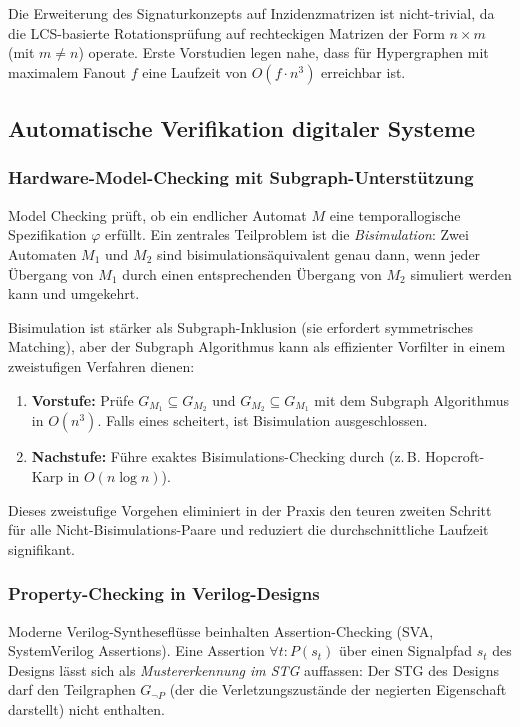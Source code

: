 ﻿\documentclass[a4paper,12pt]{article}
\theoremstyle{definition}
\begin{document}
Die Erweiterung des Signaturkonzepts auf Inzidenzmatrizen ist nicht-trivial, da
die LCS-basierte Rotationsprüfung auf rechteckigen Matrizen der Form $n \times m$
(mit $m \neq n$) operate. Erste Vorstudien legen nahe, dass für Hypergraphen mit
maximalem Fanout $f$ eine Laufzeit von $O(f \cdot n^3)$ erreichbar ist.

\subsection{Automatische Verifikation digitaler Systeme}

\subsubsection{Hardware-Model-Checking mit Subgraph-Unterstützung}

Model Checking \cite{clarke1986automatic} prüft, ob ein endlicher Automat $M$ eine
temporallogische Spezifikation $\varphi$ erfüllt. Ein zentrales Teilproblem ist die
\emph{Bisimulation}: Zwei Automaten $M_1$ und $M_2$ sind bisimulationsäquivalent genau
dann, wenn jeder Übergang von $M_1$ durch einen entsprechenden Übergang von $M_2$
simuliert werden kann und umgekehrt.

Bisimulation ist stärker als Subgraph-Inklusion (sie erfordert symmetrisches Matching),
aber der Subgraph Algorithmus kann als effizienter Vorfilter in einem zweistufigen
Verfahren dienen:
\begin{enumerate}
  \item \textbf{Vorstufe:} Prüfe $G_{M_1} \subseteq G_{M_2}$ und
        $G_{M_2} \subseteq G_{M_1}$ mit dem Subgraph Algorithmus in $O(n^3)$.
        Falls eines scheitert, ist Bisimulation ausgeschlossen.
  \item \textbf{Nachstufe:} Führe exaktes Bisimulations-Checking durch (z.\,B.
        Hopcroft-Karp \cite{hopcroft1971} in $O(n \log n)$).
\end{enumerate}
Dieses zweistufige Vorgehen eliminiert in der Praxis den teuren zweiten Schritt für
alle Nicht-Bisimulations-Paare und reduziert die durchschnittliche Laufzeit
signifikant.

\subsubsection{Property-Checking in Verilog-Designs}

Moderne Verilog-Syntheseflüsse beinhalten Assertion-Checking (SVA, SystemVerilog
Assertions). Eine Assertion $\forall t: P(s_t)$ über einen Signalpfad $s_t$ des
Designs lässt sich als \emph{Mustererkennung im STG} auffassen: Der STG des Designs
darf den Teilgraphen $G_{\neg P}$ (der die Verletzungszustände der negierten
Eigenschaft darstellt) nicht enthalten.
\end{document}

